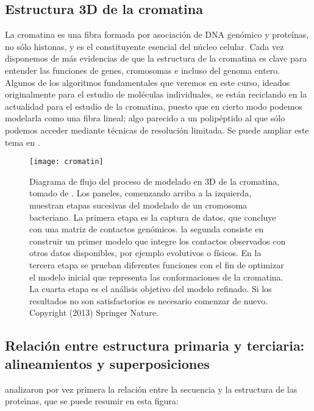 \subsection{Estructura 3D de la cromatina}

La cromatina es una fibra formada por asociaci\'{o}n de DNA gen\'{o}mico y prote\'{i}nas, no s\'{o}lo histonas, y es el constituyente
esencial del n\'{u}cleo celular. Cada vez disponemos de m\'{a}s evidencias de que la estructura de la cromatina es clave para entender 
las funciones de genes, cromosomas e incluso del genoma entero. Algunos de los algoritmos fundamentales que veremos en este curso,
ideados originalmente para el estudio de mol\'{e}culas individuales,
se est\'{a}n reciclando en la actualidad para el estudio de la cromatina, puesto que en cierto modo podemos
modelarla como una fibra lineal; algo parecido a un polip\'{e}ptido al que s\'{o}lo podemos acceder mediante t\'{e}cnicas 
de resoluci\'{o}n limitada. Se puede ampliar este tema en \citet{bau_davide_2014_1066356}.

\begin{figure}
\begin{center} 
\texttt{[image: cromatin]}
\caption%
{
Diagrama de flujo del proceso de modelado en 3D de la cromatina, tomado de \citep{Dekker2013}. 
Los paneles, comenzando arriba a la izquierda, muestran etapas sucesivas del modelado de un cromosoma bacteriano.
La primera etapa es la captura de datos, que concluye con una matriz de contactos gen\'{o}micos.
la segunda consiste en construir un primer modelo que integre los contactos observados con otros datos disponibles,
por ejemplo evolutivos o f\'{i}sicos. En la tercera etapa se prueban diferentes funciones con el fin de optimizar
el modelo inicial que representa las conformaciones de la cromatina. 
La cuarta etapa es el an\'{a}lisis objetivo del modelo refinado. 
Si los resultados no son satisfactorios es necesario comenzar de nuevo.
Copyright (2013) Springer Nature. 
}
\label{fig:cromatin}
\end{center}
\end{figure}


\subsection{Relaci\'{o}n entre estructura primaria y terciaria: alineamientos y superposiciones} \label{threedeecons}

\cite{Chothia1986} analizaron por vez primera la relaci\'{o}n entre la secuencia y la estructura de las prote\'\i{}nas, 
que se puede resumir en esta figura: 

